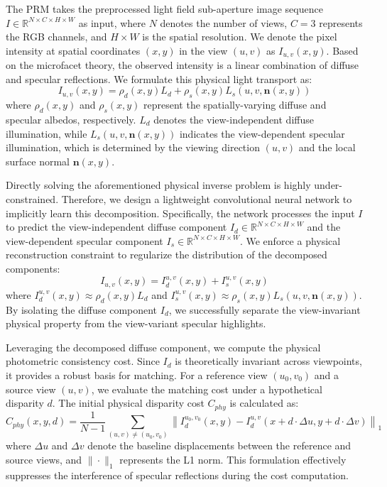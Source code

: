 \documentclass[lettersize,journal]{IEEEtran}
\begin{document}
The PRM takes the preprocessed light field sub-aperture image sequence $I \in \mathbb{R}^{N \times C \times H \times W}$ as input, where $N$ denotes the number of views, $C=3$ represents the RGB channels, and $H \times W$ is the spatial resolution. We denote the pixel intensity at spatial coordinates $(x,y)$ in the view $(u,v)$ as $I_{u,v}(x,y)$. Based on the microfacet theory, the observed intensity is a linear combination of diffuse and specular reflections. We formulate this physical light transport as:
\begin{equation}
\label{eq:eq3}
I_{u,v}(x,y) = \rho_d(x,y) L_d + \rho_s(x,y) L_s(u,v, \mathbf{n}(x,y))
\end{equation}
where $\rho_d(x,y)$ and $\rho_s(x,y)$ represent the spatially-varying diffuse and specular albedos, respectively. $L_d$ denotes the view-independent diffuse illumination, while $L_s(u,v, \mathbf{n}(x,y))$ indicates the view-dependent specular illumination, which is determined by the viewing direction $(u,v)$ and the local surface normal $\mathbf{n}(x,y)$.

Directly solving the aforementioned physical inverse problem is highly under-constrained. Therefore, we design a lightweight convolutional neural network to implicitly learn this decomposition. Specifically, the network processes the input $I$ to predict the view-independent diffuse component $I_d \in \mathbb{R}^{N \times C \times H \times W}$ and the view-dependent specular component $I_s \in \mathbb{R}^{N \times C \times H \times W}$. We enforce a physical reconstruction constraint to regularize the distribution of the decomposed components:
\begin{equation}
\label{eq:eq4}
I_{u,v}(x,y) = I_d^{u,v}(x,y) + I_s^{u,v}(x,y)
\end{equation}
where $I_d^{u,v}(x,y) \approx \rho_d(x,y) L_d$ and $I_s^{u,v}(x,y) \approx \rho_s(x,y) L_s(u,v, \mathbf{n}(x,y))$. By isolating the diffuse component $I_d$, we successfully separate the view-invariant physical property from the view-variant specular highlights.

Leveraging the decomposed diffuse component, we compute the physical photometric consistency cost. Since $I_d$ is theoretically invariant across viewpoints, it provides a robust basis for matching. For a reference view $(u_0, v_0)$ and a source view $(u,v)$, we evaluate the matching cost under a hypothetical disparity $d$. The initial physical disparity cost $C_{phy}$ is calculated as:
\begin{equation}
\label{eq:eq5}
C_{phy}(x,y,d) = \frac{1}{N-1} \sum_{(u,v) \neq (u_0,v_0)} \left\| I_d^{u_0,v_0}(x,y) - I_d^{u,v}(x + d \cdot \Delta u, y + d \cdot \Delta v) \right\|_1
\end{equation}
where $\Delta u$ and $\Delta v$ denote the baseline displacements between the reference and source views, and $\|\cdot\|_1$ represents the L1 norm. This formulation effectively suppresses the interference of specular reflections during the cost computation.
\end{document}

